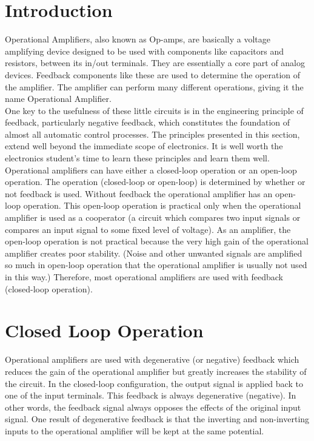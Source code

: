 \section{Introduction}
Operational Amplifiers, also known as Op-amps, are basically a voltage amplifying device designed to be used with components like capacitors and resistors, between its in/out terminals. They are essentially a core part of analog devices. Feedback components like these are used to determine the operation of the amplifier. The amplifier can perform many different operations, giving it the name Operational Amplifier.\\

One key to the usefulness of these little circuits is in the engineering principle of feedback, particularly negative feedback, which constitutes the foundation of almost all automatic control processes. The principles presented in this section, extend well beyond the immediate scope of electronics. It is well worth the electronics student's time to learn these principles and learn them well.\\

Operational amplifiers can have either a closed-loop operation or an open-loop operation. The operation (closed-loop or open-loop) is determined by whether or not feedback is used. Without feedback the operational amplifier has an open-loop operation. This open-loop operation is practical only when the operational amplifier is used as a cooperator (a circuit which compares two input signals or compares an input signal to some fixed level of voltage). As an amplifier, the open-loop operation is not practical because the very high gain of the operational amplifier creates poor stability. (Noise and other unwanted signals are amplified so much in open-loop operation that the operational amplifier is usually not used in this way.) Therefore, most operational amplifiers are used with feedback (closed-loop operation).

\newpage
\section{Closed Loop Operation}

Operational amplifiers are used with degenerative (or negative) feedback which reduces the gain of the operational amplifier but greatly increases the stability of the circuit. In the closed-loop configuration, the output signal is applied back to one of the input terminals. This feedback is always degenerative (negative). In other words, the feedback signal always opposes the effects of the original input signal. One result of degenerative feedback is that the inverting and non-inverting inputs to the operational amplifier will be kept at the same potential.\\

